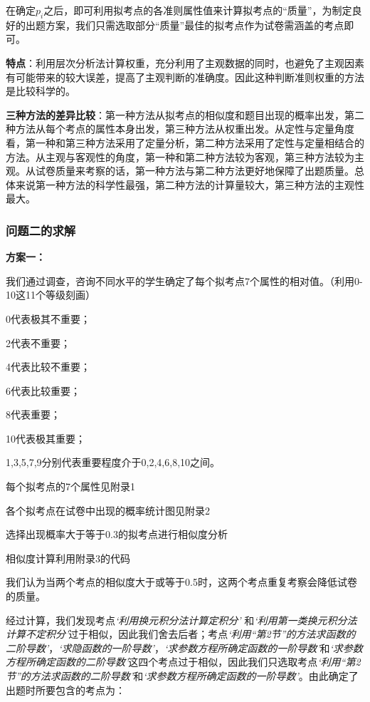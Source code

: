\documentclass{ctexart}
\begin{document}
在确定$p_{i}$之后，即可利用拟考点的各准则属性值来计算拟考点的“质量”，为制定良好的出题方案，我们只需选取部分“质量”最佳的拟考点作为试卷需涵盖的考点即可。

\textbf{特点}：利用层次分析法计算权重，充分利用了主观数据的同时，也避免了主观因素有可能带来的较大误差，提高了主观判断的准确度。因此这种判断准则权重的方法是比较科学的。

\textbf{三种方法的差异比较}：第一种方法从拟考点的相似度和题目出现的概率出发，第二种方法从每个考点的属性本身出发，第三种方法从权重出发。从定性与定量角度看，第一种和第三种方法采用了定量分析，第二种方法采用了定性与定量相结合的方法。从主观与客观性的角度，第一种和第二种方法较为客观，第三种方法较为主观。从试卷质量来考察的话，第一种方法与第二种方法更好地保障了出题质量。总体来说第一种方法的科学性最强，第二种方法的计算量较大，第三种方法的主观性最大。

\subsubsection{问题二的求解}

\textbf{方案一：}

我们通过调查，咨询不同水平的学生确定了每个拟考点7个属性的相对值。（利用0-10这11个等级刻画）

0代表极其不重要；

2代表不重要；

4代表比较不重要；

6代表比较重要；

8代表重要；

10代表极其重要；

1,3,5,7,9分别代表重要程度介于0,2,4,6,8,10之间。

每个拟考点的7个属性见附录1

各个拟考点在试卷中出现的概率统计图见附录2

选择出现概率大于等于0.3的拟考点进行相似度分析

相似度计算利用附录3的代码

我们认为当两个考点的相似度大于或等于0.5时，这两个考点重复考察会降低试卷的质量。

经过计算，我们发现考点\emph{‘利用换元积分法计算定积分’} 和\emph{‘利用第一类换元积分法计算不定积分’}过于相似，因此我们舍去后者；考点\emph{‘利用“第2节”的方法求函数的二阶导数’}，\emph{‘求隐函数的一阶导数’}，\emph{‘求参数方程所确定函数的一阶导数’}和\emph{‘求参数方程所确定函数的二阶导数’}这四个考点过于相似，因此我们只选取考点\emph{‘利用“第2节”的方法求函数的二阶导数’}和\emph{‘求参数方程所确定函数的一阶导数’}。由此确定了出题时所要包含的考点为：
\end{document}
